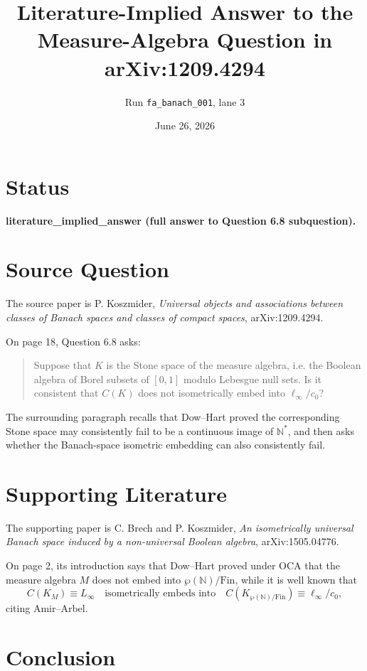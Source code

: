 \documentclass[11pt]{article}
\title{Literature-Implied Answer to the Measure-Algebra Question in arXiv:1209.4294}
\author{Run \texttt{fa\_banach\_001}, lane 3}
\date{June 26, 2026}
\newcommand{\N}{\mathbb N}
\begin{document}
\maketitle

\section*{Status}

\textbf{literature\_implied\_answer (full answer to Question 6.8 subquestion).}

\section*{Source Question}

The source paper is P. Koszmider,
\emph{Universal objects and associations between classes of Banach spaces and
classes of compact spaces}, arXiv:1209.4294.

On page 18, Question 6.8 asks:

\begin{quote}
Suppose that $K$ is the Stone space of the measure algebra, i.e. the Boolean
algebra of Borel subsets of $[0,1]$ modulo Lebesgue null sets.  Is it consistent
that $C(K)$ does not isometrically embed into $\ell_\infty/c_0$?
\end{quote}

The surrounding paragraph recalls that Dow--Hart proved the corresponding
Stone space may consistently fail to be a continuous image of $\N^*$, and then
asks whether the Banach-space isometric embedding can also consistently fail.

\section*{Supporting Literature}

The supporting paper is C. Brech and P. Koszmider,
\emph{An isometrically universal Banach space induced by a non-universal Boolean
algebra}, arXiv:1505.04776.

On page 2, its introduction says that Dow--Hart proved under OCA that the
measure algebra $M$ does not embed into $\wp(\N)/\mathrm{Fin}$, while it is
well known that
\[
  C(K_M)\equiv L_\infty
  \quad\text{isometrically embeds into}\quad
  C(K_{\wp(\N)/\mathrm{Fin}})\equiv \ell_\infty/c_0,
\]
citing Amir--Arbel.

\section*{Conclusion}
\end{document}
